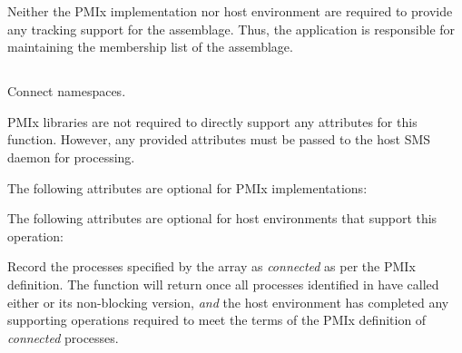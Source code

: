 Neither the \ac{PMIx} implementation nor host environment are required to provide any tracking support for the assemblage. Thus, the application is responsible for maintaining the membership list of the assemblage.
\adviceuserend


\subsection{}

\summary

Connect namespaces.

\format


\begin{arglist}
\end{arglist}

\returnsimple

\reqattrstart
\ac{PMIx} libraries are not required to directly support any attributes for this function. However, any provided attributes must be passed to the host \ac{SMS} daemon for processing.

\reqattrend

\optattrstart
The following attributes are optional for \ac{PMIx} implementations:



The following attributes are optional for host environments that support this operation:


\optattrend

\descr

Record the processes specified by the  array as \textit{connected} as per the \ac{PMIx} definition. The function will return once all processes identified in  have called either  or its non-blocking version, \textit{and} the host environment has completed any supporting operations required to meet the terms of the \ac{PMIx} definition of \textit{connected} processes.

